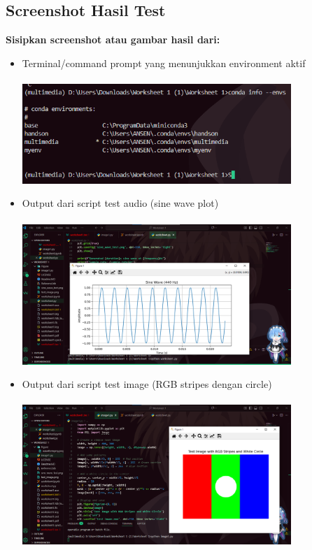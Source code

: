 \documentclass[11pt,a4paper]{article}
\begin{document}
\subsection{Screenshot Hasil Test}
\textbf{Sisipkan screenshot atau gambar hasil dari:}
\begin{itemize}
    \item Terminal/command prompt yang menunjukkan environment aktif\\\\
\includegraphics[width=0.8\textwidth]{Figure/activate_environment.png}\\
    \item Output dari script test audio (sine wave plot)\\\\
\includegraphics[width=0.8\textwidth]{Figure/waveform.png}\\
    \item Output dari script test image (RGB stripes dengan circle)\\\\
\includegraphics[width=0.8\textwidth]{Figure/rgbtest.png}\\
\end{itemize}
\end{document}
